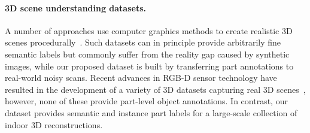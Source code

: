 \paragraph{3D scene understanding datasets.}
\label{related:datasets}


A number of approaches use computer graphics methods to create realistic 3D scenes procedurally~\cite{2012-scenesynth,handa2016understanding,song2016ssc,McCormac:etal:ICCV2017,InteriorNet18,garcia2018robotrix}.
Such datasets can in principle provide arbitrarily fine semantic labels but commonly suffer from the reality gap caused by synthetic images, while our proposed dataset is built by transferring part annotations to real-world noisy scans.
Recent advances in RGB-D sensor technology have resulted in the development of a variety of 3D datasets capturing real 3D scenes~\cite{armeni20163d,hua2016scenenn,dai2017scannet,chang2017matterport3d,2017arXiv170201105A,replica19arxiv}, however, none of these provide part-level object annotations.
In contrast, our dataset provides semantic and instance part labels for a large-scale collection of indoor 3D reconstructions.




